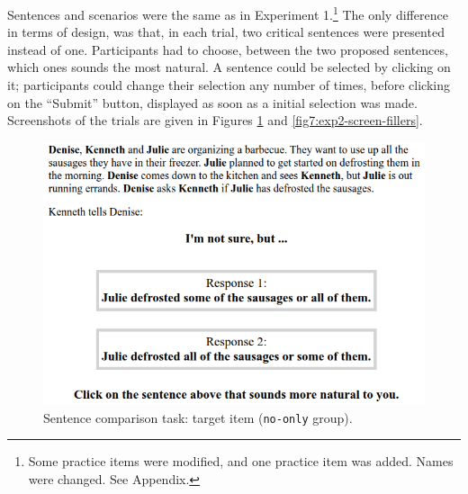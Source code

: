 Sentences and scenarios were the same as in Experiment 1.\footnote{Some practice items were modified, and one practice item was added. Names were changed. See Appendix.} The only difference in terms of design, was that, in each trial, two critical sentences were presented instead of one. Participants had to choose, between the two proposed sentences, which ones sounds the most natural. A sentence could be selected by clicking on it; participants could change their selection any number of times, before clicking on the ``Submit'' button, displayed as soon as a initial selection was made. Screenshots of the trials are given in Figures \ref{fig7:exp2-screen-target} and \ref{fig7:exp2-screen-fillers}.

\begin{figure}[H]
	\centering
	\includegraphics[width=.5\linewidth]{./images/exp2-screen-target.png}
	\caption[]{Sentence comparison task: target item (\texttt{no-only} group).}\label{fig7:exp2-screen-target}
\end{figure}

